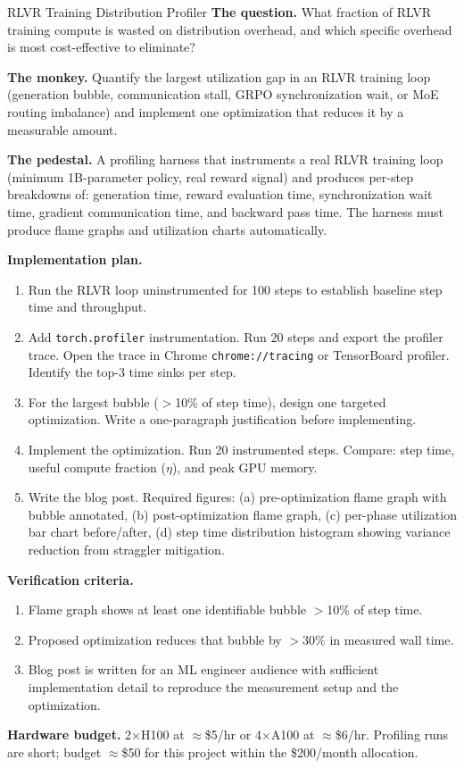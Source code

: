 \begin{portfolio}{RLVR Training Distribution Profiler}
\textbf{The question.}
What fraction of RLVR training compute is wasted on distribution overhead, and which specific
overhead is most cost-effective to eliminate?

\medskip
\textbf{The monkey.}
Quantify the largest utilization gap in an RLVR training loop
(generation bubble, communication stall, GRPO synchronization wait, or MoE routing imbalance)
and implement one optimization that reduces it by a measurable amount.

\medskip
\textbf{The pedestal.}
A profiling harness that instruments a real RLVR training loop (minimum 1B-parameter policy,
real reward signal) and produces per-step breakdowns of:
generation time, reward evaluation time, synchronization wait time, gradient communication time,
and backward pass time.
The harness must produce flame graphs and utilization charts automatically.

\medskip
\textbf{Implementation plan.}
\begin{enumerate}
  \item Run the RLVR loop uninstrumented for 100 steps to establish baseline step time and throughput.
  \item Add \texttt{torch.profiler} instrumentation. Run 20 steps and export the profiler trace.
        Open the trace in Chrome \texttt{chrome://tracing} or TensorBoard profiler.
        Identify the top-3 time sinks per step.
  \item For the largest bubble ($>$10\% of step time), design one targeted optimization.
        Write a one-paragraph justification before implementing.
  \item Implement the optimization. Run 20 instrumented steps.
        Compare: step time, useful compute fraction ($\eta$), and peak GPU memory.
  \item Write the blog post.
        Required figures: (a) pre-optimization flame graph with bubble annotated,
        (b) post-optimization flame graph, (c) per-phase utilization bar chart before/after,
        (d) step time distribution histogram showing variance reduction from straggler mitigation.
\end{enumerate}

\medskip
\textbf{Verification criteria.}
\begin{enumerate}
  \item Flame graph shows at least one identifiable bubble $>$10\% of step time.
  \item Proposed optimization reduces that bubble by $>$30\% in measured wall time.
  \item Blog post is written for an ML engineer audience with sufficient implementation detail
        to reproduce the measurement setup and the optimization.
\end{enumerate}

\medskip
\textbf{Hardware budget.}
2$\times$H100 at $\approx$\$5/hr or 4$\times$A100 at $\approx$\$6/hr.
Profiling runs are short; budget $\approx$\$50 for this project within the \$200/month allocation.
\end{portfolio}

\newpage
